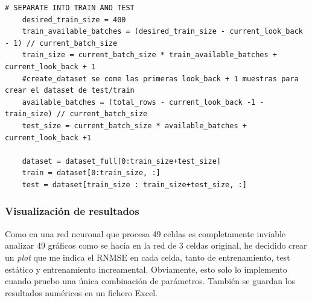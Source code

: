 \documentclass{article}
\begin{document}
\begin{lstlisting}[style=pythonstyle, caption={Adquisición dinámica de datos}]
    # SEPARATE INTO TRAIN AND TEST
    desired_train_size = 400
    train_available_batches = (desired_train_size - current_look_back - 1) // current_batch_size
    train_size = current_batch_size * train_available_batches + current_look_back + 1
    #create_dataset se come las primeras look_back + 1 muestras para crear el dataset de test/train
    available_batches = (total_rows - current_look_back -1 - train_size) // current_batch_size
    test_size = current_batch_size * available_batches + current_look_back +1

    dataset = dataset_full[0:train_size+test_size]
    train = dataset[0:train_size, :]
    test = dataset[train_size : train_size+test_size, :]
\end{lstlisting}


\subsubsection{Visualización de resultados}
Como en una red neuronal que procesa 49 celdas es completamente inviable analizar 49 gráficos como se hacía en la red de 3 celdas original, he decidido crear un \textit{plot} que me indica el RNMSE en cada celda, tanto de entrenamiento, test estático y entrenamiento increamental. Obviamente, esto solo lo implemento cuando pruebo una única combinación de parámetros. También se guardan los resultados numéricos en un fichero Excel.
\end{document}
